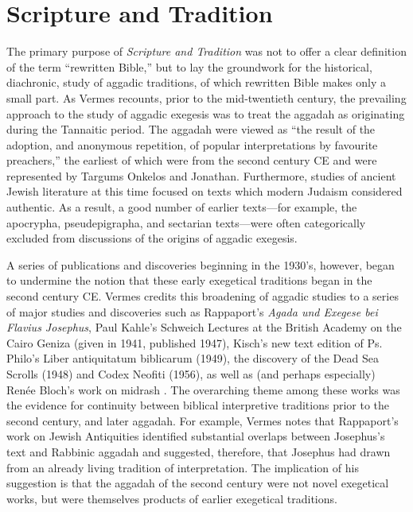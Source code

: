 \hypertarget{scripture-and-tradition}{%
\section{Scripture and Tradition}\label{scripture-and-tradition}}

The primary purpose of \emph{Scripture and Tradition} was not to offer a
clear definition of the term ``rewritten Bible,'' but to lay the
groundwork for the historical, diachronic, study of aggadic traditions,
of which rewritten Bible makes only a small
part.\autocite[3]{vermes_zsengeller2014} As Vermes recounts, prior to
the mid-twentieth century, the prevailing approach to the study of
aggadic exegesis was to treat the aggadah as originating during the
Tannaitic period. The aggadah were viewed as ``the result of the
adoption, and anonymous repetition, of popular interpretations by
favourite preachers,'' \autocite[3]{vermes1961} the earliest of which
were from the second century CE and were represented by Targums Onkelos
and Jonathan. Furthermore, studies of ancient Jewish literature at this
time focused on texts which modern Judaism considered authentic. As a
result, a good number of earlier texts---for example, the apocrypha,
pseudepigrapha, and sectarian texts---were often categorically excluded
from discussions of the origins of aggadic
exegesis.\autocite[2]{vermes1961}

A series of publications and discoveries beginning in the 1930's,
however, began to undermine the notion that these early exegetical
traditions began in the second century CE. Vermes credits this
broadening of aggadic studies to a series of major studies and
discoveries such as Rappaport's \emph{Agada und Exegese bei Flavius
Josephus},\autocite{rappaport1930} Paul Kahle's Schweich Lectures at the
British Academy on the Cairo Geniza (given in 1941, published
1947),\autocite{kahle1947} Kisch's new text edition of Ps. Philo's
Liber antiquitatum biblicarum (1949),\autocite{kisch1949} the discovery
of the Dead Sea Scrolls (1948) and Codex Neofiti (1956), as well as (and
perhaps especially) Renée Bloch's work on midrash
\autocites{bloch1954}{bloch1955_repr}[3--7]{vermes1961}. The overarching
theme among these works was the evidence for continuity between biblical
interpretive traditions prior to the second century, and later aggadah.
For example, Vermes notes that Rappaport's work on Jewish Antiquities
identified substantial overlaps between Josephus's text and Rabbinic
aggadah and suggested, therefore, that Josephus had drawn from an
already living tradition of interpretation. The implication of his
suggestion is that the aggadah of the second century were not novel
exegetical works, but were themselves products of earlier exegetical
traditions.

